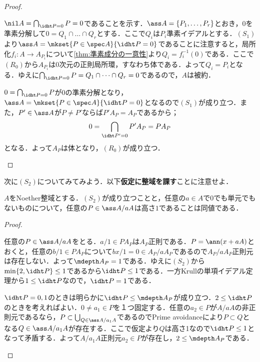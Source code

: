 \begin{proof}
	\begin{eqv}
		\item $\nil A=\bigcap_{\idht P=0}P=0$であることを示す．$\ass A=\{P_1,\dots,P_r\}$とおき，$0$を準素分解して$0=Q_1\cap\dots\cap Q_r$とする．ここで$Q_i$は$P_i$準素イデアルとする．$(S_1)$より$\ass A=\mkset{P\in\spec A}{\idht P=0}$であることに注意すると，局所化$f_i:A\to A_{P_i}$について\ref{thm:準素成分の一意性}より$Q_i=f_i^{-1}(0)$である．ここで$(R_0)$から$A_{P_i}$は$0$次元の正則局所環，すなわち体である．よって$Q_i=P_i$となる．ゆえに$\bigcap_{\idht P=0}P=Q_1\cap\dots\cap Q_r=0$であるので，$A$は被約． 
		\item $0=\bigcap_{\idht P=0}P$が$0$の準素分解となり，$\ass A=\mkset{P\in\spec A}{\idht P=0}$となるので$(S_1)$が成り立つ．また，$P'\in\ass A$が$P\neq P'$ならば$P'A_P=A_P$であるから；
		\[0=\bigcap_{\idht P'=0}P'A_P=PA_P\]
		となる．よって$A_P$は体となり，$(R_0)$が成り立つ．
	\end{eqv}
\end{proof}

次に$(S_2)$についてみてみよう．以下\textbf{仮定に整域を課す}ことに注意せよ．

\begin{lem}
	$A$をNoether整域とする．$(S_2)$が成り立つことと，任意の$a\in A$で$0$でも単元でもないものについて，任意の$P\in\ass A/aA$は高さ$1$であることは同値である．
\end{lem}

\begin{proof}
	\begin{eqv}
		\item 任意の$P\in\ass A/aA$をとる．$a/1\in PA_P$は$A_P$正則である．$P=\ann (x+aA)$とおくと，任意の$b/1\in PA_P$について$bx/1=0\in A_P/aA_P$であるので$A_P/aA_P$正則元は存在しない．よって$\mdepth A_P=1$である．ゆえに$(S_2)$から$\min\{2,\idht P\}\leq1$であるから$\idht P\leq1$である．一方Krullの単項イデアル定理から$1\leq\idht P$なので，$\idht P=1$である．
		\item $\idht P=0,1$のときは明らかに$\idht P\leq\mdepth A_P$が成り立つ．$2\leq\idht P$のときを考えればよい．$0\neq a_1\in P$を１つ固定する．任意の$a_2\in P$が$A/aA$の非正則元であるなら，$P\subset\bigcup_{Q\in\ass A/a_1A}$であるのでPrime avoidanceにより$P\subset Q$となる$Q\in\ass A/a_1A$が存在する．ここで仮定より$Q$は高さ1なので$\idht P\leq1$となって矛盾する．よって$A/a_1A$正則元$a_2\in P$が存在し，$2\leq\mdepth A_P$である．
	\end{eqv}
\end{proof}

